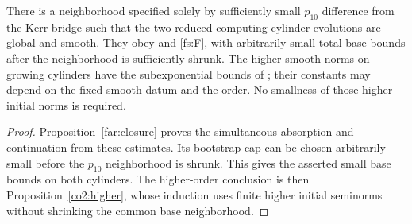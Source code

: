 \begin{corollary}
\label{fs:closure}
There is a neighborhood specified solely by sufficiently small
$p_{10}$ difference from the Kerr bridge such that the two reduced
computing-cylinder evolutions are global and smooth.  They obey
 and \eqref{fs:F}, with arbitrarily
small total base bounds after the neighborhood is sufficiently
shrunk.  The higher smooth norms on growing cylinders have the
subexponential bounds of ; their constants may depend
on the fixed smooth datum and the order.  No smallness of those
higher initial norms is required.
\end{corollary}
\begin{proof}
Proposition~\ref{far:closure} proves the simultaneous absorption and
continuation from these estimates.  Its bootstrap cap can be chosen
arbitrarily small before the $p_{10}$ neighborhood is shrunk.  This
gives the asserted small base bounds on both cylinders.
The higher-order conclusion is then Proposition~\ref{co2:higher},
whose induction uses finite higher initial seminorms without shrinking
the common base neighborhood.
\end{proof}
